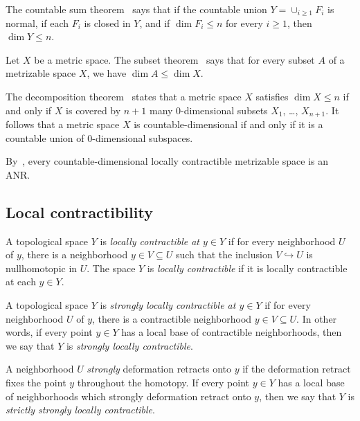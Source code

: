 \documentclass[11pt, reqno, english]{amsart}
\theoremstyle{plain}
\theoremstyle{definition}
\theoremstyle{myremark}
\begin{document}
The countable sum theorem~\cite[Theorem~5.4.1]{sakai2013geometric} says that if the countable union $Y=\cup_{i\ge 1}F_i$ is normal, if each $F_i$ is closed in $Y$, and if $\dim F_i\le n$ for every $i\ge 1$, then $\dim Y\le n$.

Let $X$ be a metric space.
The subset theorem~\cite[Theorem~5.3.3]{sakai2013geometric} says that for every subset $A$ of a metrizable space $X$, we have $\dim A \le \dim X$.

The decomposition theorem~\cite[Theorem~5.4.5]{sakai2013geometric} states that a metric space $X$ satisfies $\dim X\le n$ if and only if $X$ is covered by $n+1$ many $0$-dimensional subsets $X_1$, \ldots, $X_{n+1}$.
It follows that a metric space $X$ is countable-dimensional if and only if it is a countable union of 0-dimensional subspaces.


By~\cite[Theorem~6.10.1]{sakai2013geometric}, every countable-dimensional locally contractible metrizable space is an ANR.


\subsection{Local contractibility}
\label{ssec:local-contractibility}

A topological space $Y$ is \emph{locally contractible at $y \in Y$} if for every neighborhood $U$ of $y$, there is a neighborhood $y\in V\subseteq U$ such that the inclusion $V\hookrightarrow U$ is nullhomotopic in $U$.
The space $Y$ is \emph{locally contractible} if it is locally contractible at each $y\in Y$.

A topological space $Y$ is \emph{strongly locally contractible at $y \in Y$} if for every neighborhood $U$ of $y$, there is a contractible neighborhood $y\in V\subseteq U$.
In other words, if every point $y\in Y$ has a local base of contractible neighborhoods, then we say that $Y$ is \emph{strongly locally contractible}.

A neighborhood $U$ \emph{strongly} deformation retracts onto $y$ if the deformation retract fixes the point $y$ throughout the homotopy.
If every point $y\in Y$ has a local base of neighborhoods which strongly deformation retract onto $y$, then we say that $Y$ is \emph{strictly strongly locally contractible}.
\end{document}
